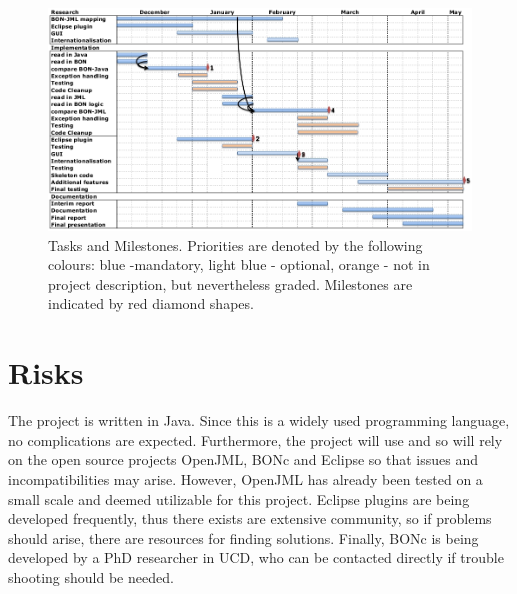 \documentclass[]{mngt_deliverable}
\begin{document}
\begin{figure}[h]
\centering
	\includegraphics[width=1.0\textwidth]{ganttChart} 
	
\caption{\label{fig:logo} Tasks and Milestones. Priorities are denoted by the following colours: blue -mandatory, light blue - optional, orange - not in project description, but nevertheless graded. Milestones are indicated by red diamond shapes.}
\end{figure} 


\section{Risks}
The project is written in Java. Since this is a widely used programming language, no complications are expected. Furthermore, the project will use and so will rely on the open source projects OpenJML, BONc and Eclipse so that issues and incompatibilities may arise. However, OpenJML has already been tested on a small scale and deemed utilizable for this project. Eclipse plugins are being developed frequently, thus there exists are extensive community, so if problems should arise, there are resources for finding solutions. Finally, BONc is being developed by a PhD researcher in UCD, who can be contacted directly if trouble shooting should be needed.
\end{document}
